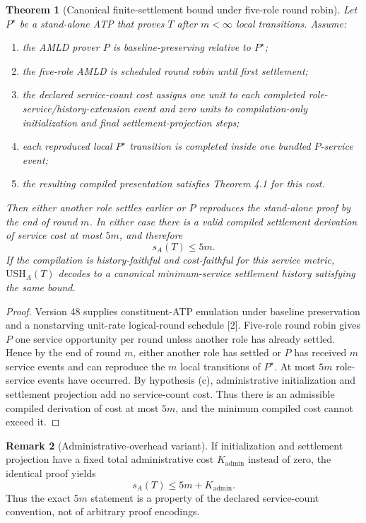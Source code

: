 \documentclass[11pt]{article}
\newtheorem{theorem}{Theorem}[section]
\theoremstyle{definition}
\newtheorem{remark}[theorem]{Remark}
\newcommand{\USH}{\ensuremath{\mathrm{USH}}}
\begin{document}
\begin{theorem}[Canonical finite-settlement bound under five-role round robin]
Let $P^\star$ be a stand-alone ATP that proves $T$ after $m<\infty$ local transitions. Assume:
\begin{enumerate}[label=(\alph*)]
\item the AMLD prover $P$ is baseline-preserving relative to $P^\star$;
\item the five-role AMLD is scheduled round robin until first settlement;
\item the declared service-count cost assigns one unit to each completed role-service/history-extension event and zero units to compilation-only initialization and final settlement-projection steps;
\item each reproduced local $P^\star$ transition is completed inside one bundled $P$-service event;
\item the resulting compiled presentation satisfies Theorem 4.1 for this cost.
\end{enumerate}
Then either another role settles earlier or $P$ reproduces the stand-alone proof by the end of round $m$. In either case there is a valid compiled settlement derivation of service cost at most $5m$, and therefore
\[
s_A(T)\le 5m.
\]
If the compilation is history-faithful and cost-faithful for this service metric, $\USH_A(T)$ decodes to a canonical minimum-service settlement history satisfying the same bound.
\end{theorem}

\begin{proof}
Version 48 supplies constituent-ATP emulation under baseline preservation and a nonstarving unit-rate logical-round schedule [2]. Five-role round robin gives $P$ one service opportunity per round unless another role has already settled. Hence by the end of round $m$, either another role has settled or $P$ has received $m$ service events and can reproduce the $m$ local transitions of $P^\star$. At most $5m$ role-service events have occurred. By hypothesis (c), administrative initialization and settlement projection add no service-count cost. Thus there is an admissible compiled derivation of cost at most $5m$, and the minimum compiled cost cannot exceed it.
\end{proof}

\begin{remark}[Administrative-overhead variant]
If initialization and settlement projection have a fixed total administrative cost $K_{\mathrm{admin}}$ instead of zero, the identical proof yields
\[
s_A(T)\le 5m+K_{\mathrm{admin}}.
\]
Thus the exact $5m$ statement is a property of the declared service-count convention, not of arbitrary proof encodings.
\end{remark}
\end{document}
